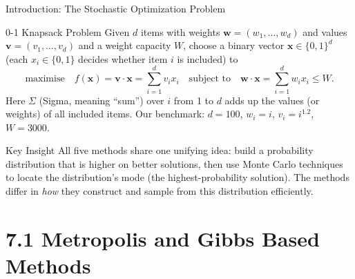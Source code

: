 \documentclass[aspectratio=169,10pt]{beamer}
\newcommand{\bx}{\mathbf{x}}
\newcommand{\bv}{\mathbf{v}}
\newcommand{\bw}{\mathbf{w}}
\begin{document}
\begin{frame}[allowframebreaks]{Introduction: The Stochastic Optimization Problem}
\begin{block}{0-1 Knapsack Problem}
  Given $d$ items with weights $\bw = (w_1,\ldots,w_d)$ and values
  $\bv = (v_1,\ldots,v_d)$ and a weight capacity $W$, choose a binary
  vector $\bx \in \{0,1\}^d$ (each $x_i \in \{0,1\}$ decides whether item
  $i$ is included) to
  \[
    \text{maximise} \quad f(\bx) = \bv\cdot\bx = \sum_{i=1}^d v_i x_i
    \quad \text{subject to} \quad \bw\cdot\bx = \sum_{i=1}^d w_i x_i \le W.
  \]
  Here $\Sigma$ (Sigma, meaning ``sum'') over $i$ from 1 to $d$ adds up the
  values (or weights) of all included items.  Our benchmark: $d=100$,
  $w_i=i$, $v_i=i^{1.2}$, $W=3000$.
\end{block}

\begin{alertblock}{Key Insight}
  All five methods share one unifying idea: build a probability distribution
  that is higher on better solutions, then use Monte Carlo techniques to
  locate the distribution's mode (the highest-probability solution).  The
  methods differ in \emph{how} they construct and sample from this
  distribution efficiently.
\end{alertblock}

\end{frame}

\section{7.1 Metropolis and Gibbs Based Methods}
\end{document}
